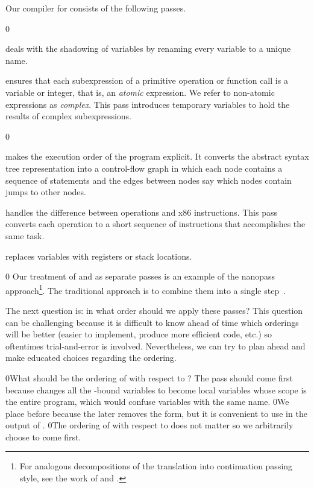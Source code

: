\documentclass[7x10,nocrop]{TimesAPriori_MIT}%
\def\racketEd{0}
\def\edition{1}
\newcommand{\racket}[1]{{\if\edition\racketEd{#1}\fi}}
\begin{document}
Our compiler for \LangVar{} consists of the following passes.
%
\begin{description}
{\if\edition\racketEd
\item[\key{uniquify}] deals with the shadowing of variables by
  renaming every variable to a unique name.
  \fi}

\item[\key{remove\_complex\_operands}] ensures that each subexpression
  of a primitive operation or function call is a variable or integer,
  that is, an \emph{atomic} expression. We refer to non-atomic
  expressions as \emph{complex}.  This pass introduces temporary
  variables to hold the results of complex
  subexpressions.%
  
{\if\edition\racketEd
\item[\key{explicate\_control}] makes the execution order of the
  program explicit. It converts the abstract syntax tree representation
  into a control-flow graph in which each node contains a sequence of
  statements and the edges between nodes say which nodes contain jumps
  to other nodes.
\fi}

\item[\key{select\_instructions}] handles the difference between
  \LangVar{} operations and x86 instructions. This pass converts each
  \LangVar{} operation to a short sequence of instructions that
  accomplishes the same task.

\item[\key{assign\_homes}] replaces variables with registers or stack
  locations.
\end{description}
%
{\if\edition\racketEd
%
Our treatment of  and
 as separate passes is an example of the
nanopass approach\footnote{For analogous decompositions of the
  translation into continuation passing style, see the work of
  \citet{Lawall:1993} and \citet{Hatcliff:1994ea}.}.  The traditional
approach is to combine them into a single step~\citep{Aho:2006wb}.
%  
\fi}

The next question is: in what order should we apply these passes? This
question can be challenging because it is difficult to know ahead of
time which orderings will be better (easier to implement, produce more
efficient code, etc.) so oftentimes trial-and-error is
involved. Nevertheless, we can try to plan ahead and make educated
choices regarding the ordering.

\racket{What should be the ordering of  with respect to
\key{uniquify}? The \key{uniquify} pass should come first because
\key{explicate\_control} changes all the \key{let}-bound variables to
become local variables whose scope is the entire program, which would
confuse variables with the same name.}
%
\racket{We place  before \key{explicate\_control}
because the later removes the \key{let} form, but it is convenient to
use \key{let} in the output of .}
%
\racket{The ordering of  with respect to
\key{remove\_complex\_opera*} does not matter so we arbitrarily choose
\key{uniquify} to come first.}
\end{document}
